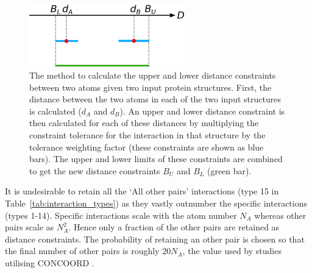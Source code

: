 \begin{figure}
\centering

\includegraphics[width=0.6\textwidth]{figures/distance_constraints/distance_constraints}

\caption{The method to calculate the upper and lower distance constraints between two atoms given two input protein structures.
First, the distance between the two atoms in each of the two input structures is calculated ($d_{A}$ and $d_{B}$).
An upper and lower distance constraint is then calculated for each of these distances by multiplying the constraint tolerance for the interaction in that structure by the tolerance weighting factor (these constraints are shown as blue bars).
The upper and lower limits of these constraints are combined to get the new distance constraints $B_{U}$ and $B_{L}$ (green bar).}

\label{fig:distance_constraints}
\end{figure}


It is undesirable to retain all the `All other pairs' interactions (type 15 in Table~\ref{tab:interaction_types}) as they vastly outnumber the specific interactions (types 1-14).
Specific interactions scale with the atom number $N_{A}$ whereas other pairs scale as $N_{A}^{2}$.
Hence only a fraction of the other pairs are retained as distance constraints.
The probability of retaining an other pair is chosen so that the final number of other pairs is roughly $20N_{A}$, the value used by studies utilising CONCOORD \cite{DeGroot1999}.


